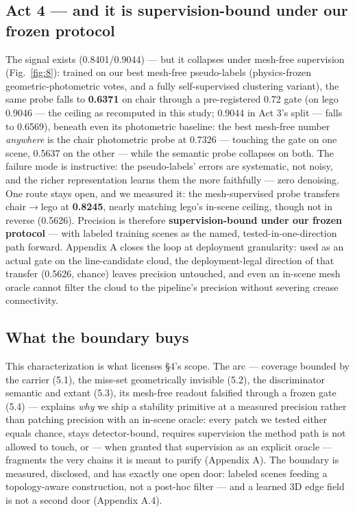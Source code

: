 \subsection{Act 4 --- and it is supervision-bound under our frozen protocol}
The signal exists (0.8401/0.9044) --- but it collapses under mesh-free supervision (Fig.~\ref{fig:8}): trained
on our best mesh-free pseudo-labels (physics-frozen geometric-photometric votes, and a
fully self-supervised clustering variant), the same probe falls to \textbf{0.6371} on chair
through a pre-registered 0.72 gate (on lego 0.9046 --- the ceiling as recomputed in this
study; 0.9044 in Act 3's split --- falls to 0.6569), beneath even its photometric baseline:
the best mesh-free number \emph{anywhere} is the chair photometric probe at 0.7326 --- touching
the gate on one scene, 0.5637 on the other --- while the semantic probe collapses on both. The failure mode is instructive: the pseudo-labels' errors are systematic, not
noisy, and the richer representation learns them the more faithfully --- zero denoising. One
route stays open, and we measured it: the mesh-supervised probe transfers chair$\rightarrow$lego at
\textbf{0.8245}, nearly matching lego's in-scene ceiling, though not in reverse (0.5626).
Precision is therefore \textbf{supervision-bound under our frozen protocol} --- with labeled
training scenes as the named, tested-in-one-direction path forward. Appendix A closes the
loop at deployment granularity: used as an actual gate on the line-candidate cloud, the
deployment-legal direction of that transfer (0.5626, chance) leaves precision untouched,
and even an in-scene mesh oracle cannot filter the cloud to the pipeline's precision
without severing crease connectivity.

\subsection{What the boundary buys}
This characterization is what licenses \S4's scope. The arc --- coverage bounded by the
carrier (5.1), the miss-set geometrically invisible (5.2), the discriminator semantic and
extant (5.3), its mesh-free readout falsified through a frozen gate (5.4) --- explains
\emph{why} we ship a stability primitive at a measured precision rather than patching precision
with an in-scene oracle: every patch we tested either equals chance, stays
detector-bound, requires supervision the method path is not allowed to touch, or --- when
granted that supervision as an explicit oracle --- fragments the very chains it is meant to
purify (Appendix A). The boundary is measured, disclosed, and has exactly one open door:
labeled scenes feeding a topology-aware construction, not a post-hoc filter --- and a learned
3D edge field is not a second door (Appendix A.4).

